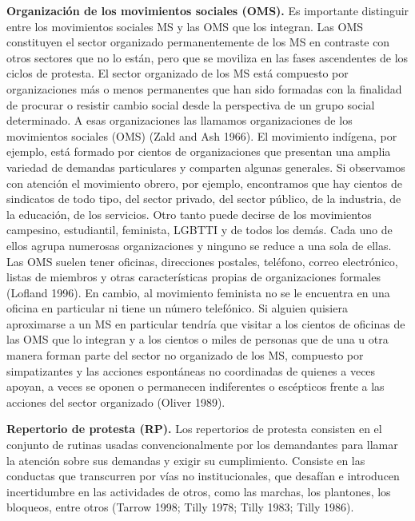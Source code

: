 \documentclass[letterpaper, 11pt]{book}
\theoremstyle{definition}
\theoremstyle{remark}
\begin{document}
{{{{{{{{\textbf{Organización de los movimientos sociales (OMS).} \small{Es importante distinguir entre los movimientos sociales MS y las OMS que los integran.
Las OMS constituyen el sector organizado permanentemente de los MS en contraste con otros sectores que no lo están, pero que se moviliza en las fases ascendentes de los ciclos de protesta.
El sector organizado de los MS está compuesto por organizaciones más o menos permanentes que han sido formadas con la finalidad de procurar o resistir cambio social desde la perspectiva de un grupo social determinado.
A esas organizaciones las llamamos organizaciones de los movimientos sociales (OMS) (Zald and Ash 1966).
El movimiento indígena, por ejemplo, está formado por cientos de organizaciones que presentan una amplia variedad de demandas particulares y comparten algunas generales.
Si observamos con atención el movimiento obrero, por ejemplo, encontramos que hay cientos de sindicatos de todo tipo, del sector privado, del sector público, de la industria, de la educación, de los servicios.
Otro tanto puede decirse de los movimientos campesino, estudiantil, feminista, LGBTTI y de todos los demás.
Cada uno de ellos agrupa numerosas organizaciones y ninguno se reduce a una sola de ellas.
Las OMS suelen tener oficinas, direcciones postales, teléfono, correo electrónico, listas de miembros y otras características propias de organizaciones formales (Lofland 1996).
En cambio, al movimiento feminista no se le encuentra en una oficina en particular ni tiene un número telefónico.
Si alguien quisiera aproximarse a un MS en particular tendría que visitar a los cientos de oficinas de las OMS que lo integran y a los cientos o miles de personas que de una u otra manera forman parte del sector no organizado de los MS, compuesto por simpatizantes y las acciones espontáneas no coordinadas de quienes a veces apoyan, a veces se oponen o permanecen indiferentes o escépticos frente a las acciones del sector organizado (Oliver 1989).}\vspace{1em}


{\textbf{Repertorio de protesta (RP).} \small{Los repertorios de protesta consisten en el conjunto de rutinas usadas convencionalmente por los demandantes para llamar la atención sobre sus demandas y exigir su cumplimiento.
Consiste en las conductas que transcurren por vías no institucionales, que desafían e introducen incertidumbre en las actividades de otros, como las marchas, los plantones, los bloqueos, entre otros (Tarrow 1998; Tilly 1978; Tilly 1983; Tilly 1986).}\vspace{1em}


}}}}}}}}}
\end{document}
